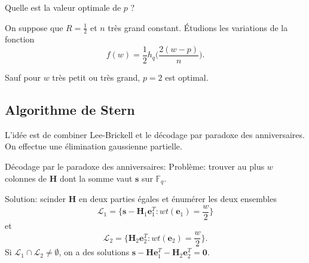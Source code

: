 \documentclass{scrartcl}[a4paper,10pt,headings=small,footinclude=false]
\theoremstyle{definition}
\theoremstyle{remark}
\begin{document}
Quelle est la valeur optimale de $p$ ?

On suppose que $R=\frac{1}{2}$ et $n$ très grand constant.
Étudions les variations de la fonction
\[
f(w)= \frac{1}{2} h_q\bigg(\frac{2(w - p)}{n}\bigg).
\]


Sauf pour $w$ très petit ou très grand, $p=2$ est optimal.



\subsection{Algorithme de Stern}

L'idée est de combiner Lee-Brickell et le décodage par paradoxe des anniversaires. On effectue une élimination gaussienne partielle.

Décodage par le paradoxe des anniversaires:
Problème: trouver au plus $w$ colonnes de $\textbf{H}$ dont la somme vaut $\textbf{s}$ sur $\mathbb{F}_q$.

Solution: scinder $\textbf{H}$ en deux parties égales et énumérer les deux ensembles
\[\mathcal{L}_1=\big\{ \textbf{s}-\textbf{H}_1\textbf{e}_1^T : wt(\textbf{e}_1) =\frac{w}{2} \big\}\]
et \[\mathcal{L}_2=\big\{ \textbf{H}_2 \textbf{e}_2^T : wt(\textbf{e}_2) = \frac{w}{2}\big\}.\]
Si $\mathcal{L}_1\cap \mathcal{L}_2\neq \emptyset$, on a des solutions $\textbf{s}-\textbf{H}\textbf{e}_1^T-\textbf{H}_2\textbf{e}_2^T=\textbf{0}$.
\end{document}
